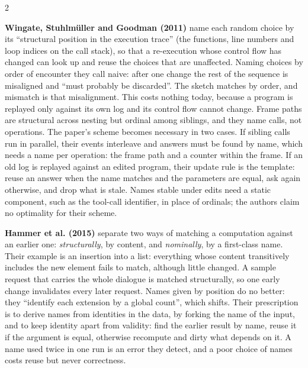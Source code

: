 \documentclass{article}
\newcommand{\topic}[1]{\par\medskip{\bfseries\normalsize #1}\par\smallskip}
\newcommand{\paper}[1]{\par\smallskip\textbf{#1}\quad}
\newcommand{\cd}[1]{{\ttfamily #1}}
\begin{document}
\begin{multicols}{2}
\topic{Names and reuse}

\paper{Wingate, Stuhlm\"uller and Goodman (2011)} name each random choice by its ``structural
position in the execution trace'' (the functions, line numbers and loop indices on the call
stack), so that a re-execution whose control flow has changed can look up and reuse the choices
that are unaffected. Naming choices by order of encounter they call naive: after one change the
rest of the sequence is misaligned and ``must probably be discarded''. The sketch matches by
order, and \cd{mismatch} is that misalignment. This costs nothing today, because a program is
replayed only against its own log and its control flow cannot change. Frame paths are structural
across nesting but ordinal among siblings, and they name calls, not operations. The paper's
scheme becomes necessary in two cases. If sibling calls run in parallel, their events interleave
and answers must be found by name, which needs a name per operation: the frame path and a counter
within the frame. If an old log is replayed against an edited program, their update rule is the
template: reuse an answer when the name matches and the parameters are equal, ask again
otherwise, and drop what is stale. Names stable under edits need a static component, such as the
tool-call identifier, in place of ordinals; the authors claim no optimality for their scheme.

\paper{Hammer et al. (2015)} separate two ways of matching a computation against an earlier one:
\emph{structurally}, by content, and \emph{nominally}, by a first-class name. Their example is an
insertion into a list: everything whose content transitively includes the new element fails to
match, although little changed. A \cd{sample} request that carries the whole dialogue is matched
structurally, so one early change invalidates every later request. Names given by position do no
better: they ``identify each extension by a global count'', which shifts. Their prescription is
to derive names from identities in the data, by forking the name of the input, and to keep
identity apart from validity: find the earlier result by name, reuse it if the argument is equal,
otherwise recompute and dirty what depends on it. A name used twice in one run is an error they
detect, and a poor choice of names costs reuse but never correctness.


\end{multicols}
\end{document}
